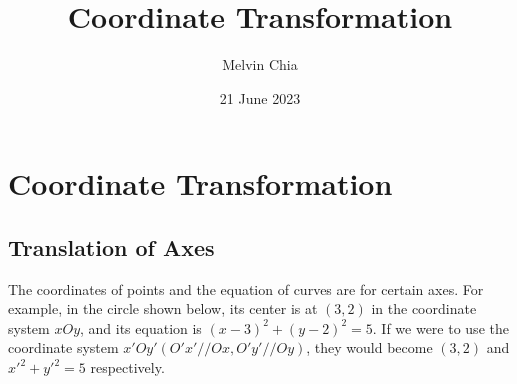 \documentclass{report}
\title{\Huge{\textbf{Coordinate Transformation}}}
\author{Melvin Chia}
\date{21 June 2023}
\begin{document}
\maketitle

\onehalfspacing{}

\chapter{Coordinate Transformation}

\section{Translation of Axes}
The coordinates of points and the equation of curves are for certain axes. For
example, in the circle shown below, its center is at $(3, 2)$ in the coordinate
system $xOy$, and its equation is ${(x - 3)}^2 + {(y - 2)}^2 = 5$. If we were
to use the coordinate system $x'Oy' (O'x' // Ox, O'y' // Oy)$, they would
become $(3, 2)$ and $x'^2 + y'^2 = 5$ respectively.
\end{document}
